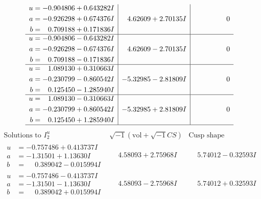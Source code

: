 \documentclass[1p]{elsarticle_modified}
\theoremstyle{definition}
\newcommand{\I}{\sqrt{-1}}
\begin{document}
$$\begin{array}{c|c|c}
\begin{aligned}
u &= -0.904806 + 0.643282 I \\
a &= -0.926298 + 0.674376 I \\
b &= \phantom{-}0.709188 + 0.171836 I\end{aligned}
 & \phantom{-}4.62609 + 2.70135 I & \phantom{-0.000000 } 0 \\ \hline\begin{aligned}
u &= -0.904806 - 0.643282 I \\
a &= -0.926298 - 0.674376 I \\
b &= \phantom{-}0.709188 - 0.171836 I\end{aligned}
 & \phantom{-}4.62609 - 2.70135 I & \phantom{-0.000000 } 0 \\ \hline\begin{aligned}
u &= \phantom{-}1.089130 + 0.310663 I \\
a &= -0.230799 - 0.860542 I \\
b &= \phantom{-}0.125450 - 1.285940 I\end{aligned}
 & -5.32985 - 2.81809 I & \phantom{-0.000000 } 0 \\ \hline\begin{aligned}
u &= \phantom{-}1.089130 - 0.310663 I \\
a &= -0.230799 + 0.860542 I \\
b &= \phantom{-}0.125450 + 1.285940 I\end{aligned}
 & -5.32985 + 2.81809 I & \phantom{-0.000000 } 0\\
 \hline 
 \end{array}$$\newpage$$\begin{array}{c|c|c}  
\text{Solutions to }I^u_{2}& \I (\text{vol} + \sqrt{-1}CS) & \text{Cusp shape}\\
 \hline 
\begin{aligned}
u &= -0.757486 + 0.413737 I \\
a &= -1.31501 + 1.13630 I \\
b &= \phantom{-}0.389042 - 0.015994 I\end{aligned}
 & \phantom{-}4.58093 + 2.75968 I & \phantom{-}5.74012 - 0.32593 I \\ \hline\begin{aligned}
u &= -0.757486 - 0.413737 I \\
a &= -1.31501 - 1.13630 I \\
b &= \phantom{-}0.389042 + 0.015994 I\end{aligned}
 & \phantom{-}4.58093 - 2.75968 I & \phantom{-}5.74012 + 0.32593 I \\ \hline\begin{aligned}

\end{aligned}
\end{array}$$
\end{document}
